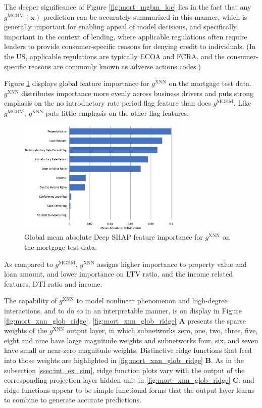 \documentclass[information,article,submit,moreauthors,pdftex]{definitions/mdpi}
\begin{document}
{\noindent The deeper significance of Figure \ref{fig:mort_mgbm_loc} lies in the fact that any $g^\text{MGBM}(\mathbf{x})$ prediction can be accurately summarized in this manner, which is generally important for enabling appeal of model decisions, and specifically important in the context of lending, where applicable regulations often require lenders to provide consumer-specific reasons for denying credit to individuals. (In the US, applicable regulations are typically ECOA and FCRA, and the consumer-specific reasons are commonly known as adverse actions codes.)

Figure \ref{fig:mort_xnn_glob} displays global feature importance for $g^\text{XNN}$ on the mortgage test data. $g^\text{XNN}$ distributes importance more evenly across business drivers and puts strong emphasis on the no introductory rate period flag feature than does $g^\text{MGBM}$. Like $g^\text{MGBM}$, $g^\text{XNN}$ puts little emphasis on the other flag features.  

\begin{figure}[H]
\centering
\includegraphics[width=8cm]{img/mort_xnn_glob.png}
\caption{Global mean absolute Deep SHAP feature importance for $g^\text{XNN}$ on the mortgage test data.}
\label{fig:mort_xnn_glob}
\end{figure} 

\noindent As compared to $g^\text{MGBM}$, $g^\text{XNN}$ assigns higher importance to property value and loan amount, and lower importance on LTV ratio, and the income related features, DTI ratio and income. 

The capability of $g^\text{XNN}$ to model nonlinear phenomenon and high-degree interactions, and to do so in an interpretable manner, is on display in Figure \ref{fig:mort_xnn_glob_ridge}. \ref{fig:mort_xnn_glob_ridge} \textbf{A} presents the sparse weights of the $g^\text{XNN}$ output layer, in which subnetworks zero, one, two, three, five, eight and nine have large magnitude weights and subnetworks four, six, and seven have small or near-zero magnitude weights. Distinctive ridge functions that feed into those weights are highlighted in \ref{fig:mort_xnn_glob_ridge} \textbf{B}. As in the subsection \ref{ssec:int_ex_sim}, ridge function plots vary with the output of the corresponding projection layer hidden unit in \ref{fig:mort_xnn_glob_ridge} \textbf{C}, and ridge functions appear to be simple functional forms that the output layer learns to combine to generate accurate predictions.  

}
\end{document}
